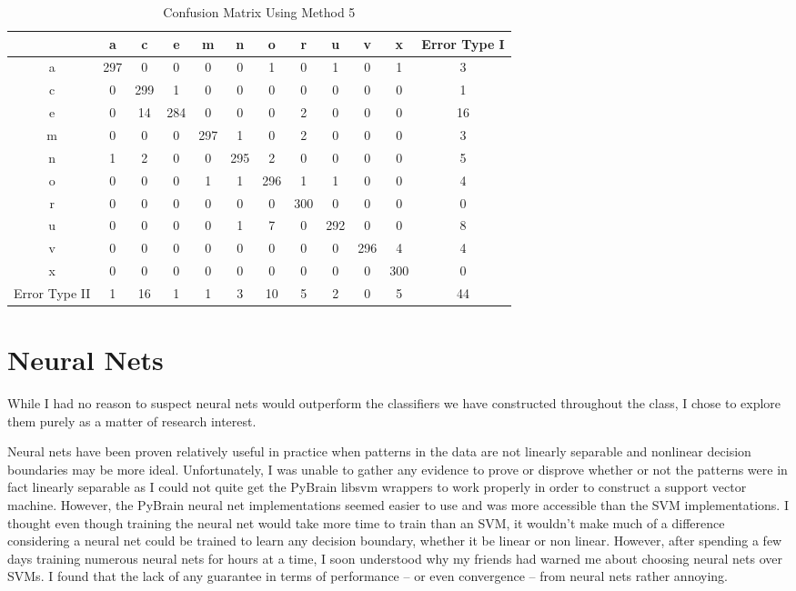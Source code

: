 \documentclass[12pt]{article}
\begin{document}
\begin{table}[!ht]
    \centering
    \caption{Confusion Matrix Using Method 5}
    \begin{tabular}{| c | c | c | c | c | c | c | c | c | c | c | c |} \hline
        & a & c & e & m & n & o & r & u & v & x & Error Type I\\ \hline
      a & 297 & 0 & 0 & 0 & 0 & 1 & 0 & 1 & 0 & 1 & 3\\ \hline
      c & 0 & 299 & 1 & 0 & 0 & 0 & 0 & 0 & 0 & 0 & 1\\ \hline
      e & 0 & 14 & 284 & 0 & 0 & 0 & 2 & 0 & 0 & 0 & 16\\ \hline
      m & 0 & 0 & 0 & 297 & 1 & 0 & 2 & 0 & 0 & 0 & 3\\ \hline
      n & 1 & 2 & 0 & 0 & 295 & 2 & 0 & 0 & 0 & 0 & 5\\ \hline
      o & 0 & 0 & 0 & 1 & 1 & 296 & 1 & 1 & 0 & 0 & 4\\ \hline
      r & 0 & 0 & 0 & 0 & 0 & 0 & 300 & 0 & 0 & 0 & 0\\ \hline
      u & 0 & 0 & 0 & 0 & 1 & 7 & 0 & 292 & 0 & 0 & 8\\ \hline
      v & 0 & 0 & 0 & 0 & 0 & 0 & 0 & 0 & 296 & 4 & 4\\ \hline
      x & 0 & 0 & 0 & 0 & 0 & 0 & 0 & 0 & 0 & 300 & 0\\ \hline
Error Type II & 1 & 16 & 1 & 1 & 3 & 10 & 5 & 2 & 0 & 5 & 44\\ \hline
    \end{tabular}
    \label{tab:wavelet}
\end{table}

\section{Neural Nets}

While I had no reason to suspect neural nets would outperform the classifiers
we have constructed throughout the class, I chose to explore them purely as a
matter of research interest.     

Neural nets have been proven relatively useful in practice when patterns in the
data are not linearly separable and nonlinear decision boundaries may be more
ideal. Unfortunately, I was unable to gather any evidence to prove or disprove
whether or not the patterns were in fact linearly separable as I could not
quite get the PyBrain\cite{website:pybrain} libsvm wrappers to work properly in
order to construct a support vector machine. However, the PyBrain neural net
implementations seemed easier to use and was more accessible than the SVM
implementations. I thought even though training the neural net would take more
time to train than an SVM, it wouldn't make much of a difference considering a
neural net could be trained to learn any decision boundary, whether it be
linear or non linear. However, after spending a few days training numerous
neural nets for hours at a time, I soon understood why my friends had warned me
about choosing neural nets over SVMs. I found that the lack of any guarantee in
terms of performance -- or even convergence -- from neural nets rather annoying.
\end{document}
